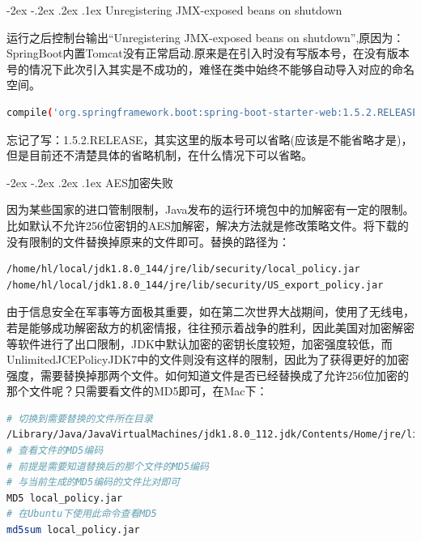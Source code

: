 \documentclass[11pt,fleqn]{book}
\makeatletter
\numberwithin{dummy}{section}
\theoremstyle{ocrenumbox}
\theoremstyle{blacknumex}
\theoremstyle{blacknumbox}
\theoremstyle{ocrenum}
\renewcommand\paragraph{\@startsection{paragraph}{4}{\z@}
	{-2ex \@plus-.2ex \@minus .2ex}
	{.1ex}
	{\normalfont\small\sffamily\bfseries}}
\makeatother
\begin{document}
\paragraph{Unregistering JMX-exposed beans on shutdown}

运行之后控制台输出“Unregistering JMX-exposed beans on shutdown”,原因为：SpringBoot内置Tomcat没有正常启动.原来是在引入时没有写版本号，在没有版本号的情况下此次引入其实是不成功的，难怪在类中始终不能够自动导入对应的命名空间。

\begin{lstlisting}[language=Bash]
compile('org.springframework.boot:spring-boot-starter-web:1.5.2.RELEASE')
\end{lstlisting}

忘记了写：1.5.2.RELEASE，其实这里的版本号可以省略(应该是不能省略才是)，但是目前还不清楚具体的省略机制，在什么情况下可以省略。

\paragraph{AES加密失败}

因为某些国家的进口管制限制，Java发布的运行环境包中的加解密有一定的限制。比如默认不允许256位密钥的AES加解密，解决方法就是修改策略文件。将下载的没有限制的文件替换掉原来的文件即可。替换的路径为：

\begin{lstlisting}[language=Bash]
/home/hl/local/jdk1.8.0_144/jre/lib/security/local_policy.jar
/home/hl/local/jdk1.8.0_144/jre/lib/security/US_export_policy.jar
\end{lstlisting}

由于信息安全在军事等方面极其重要，如在第二次世界大战期间，使用了无线电，若是能够成功解密敌方的机密情报，往往预示着战争的胜利，因此美国对加密解密等软件进行了出口限制，JDK中默认加密的密钥长度较短，加密强度较低，而UnlimitedJCEPolicyJDK7中的文件则没有这样的限制，因此为了获得更好的加密强度，需要替换掉那两个文件。如何知道文件是否已经替换成了允许256位加密的那个文件呢？只需要看文件的MD5即可，在Mac下：

\begin{lstlisting}[language=Bash]
# 切换到需要替换的文件所在目录
/Library/Java/JavaVirtualMachines/jdk1.8.0_112.jdk/Contents/Home/jre/lib/security/
# 查看文件的MD5编码
# 前提是需要知道替换后的那个文件的MD5编码
# 与当前生成的MD5编码的文件比对即可
MD5 local_policy.jar
# 在Ubuntu下使用此命令查看MD5
md5sum local_policy.jar
\end{lstlisting}
\end{document}
